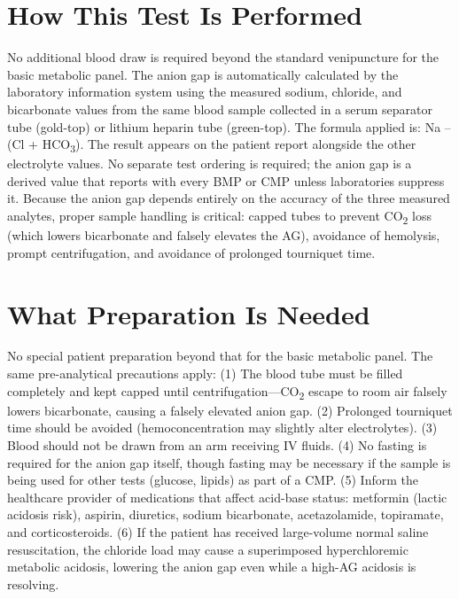 \section*{How This Test Is Performed}
No additional blood draw is required beyond the standard venipuncture for the basic metabolic panel. The anion gap is automatically calculated by the laboratory information system using the measured sodium, chloride, and bicarbonate values from the same blood sample collected in a serum separator tube (gold-top) or lithium heparin tube (green-top). The formula applied is: Na -- (Cl + HCO\textsubscript{3}). The result appears on the patient report alongside the other electrolyte values. No separate test ordering is required; the anion gap is a derived value that reports with every BMP or CMP unless laboratories suppress it. Because the anion gap depends entirely on the accuracy of the three measured analytes, proper sample handling is critical: capped tubes to prevent CO\textsubscript{2} loss (which lowers bicarbonate and falsely elevates the AG), avoidance of hemolysis, prompt centrifugation, and avoidance of prolonged tourniquet time.

\section*{What Preparation Is Needed}
No special patient preparation beyond that for the basic metabolic panel. The same pre-analytical precautions apply: (1) The blood tube must be filled completely and kept capped until centrifugation---CO\textsubscript{2} escape to room air falsely lowers bicarbonate, causing a falsely elevated anion gap. (2) Prolonged tourniquet time should be avoided (hemoconcentration may slightly alter electrolytes). (3) Blood should not be drawn from an arm receiving IV fluids. (4) No fasting is required for the anion gap itself, though fasting may be necessary if the sample is being used for other tests (glucose, lipids) as part of a CMP. (5) Inform the healthcare provider of medications that affect acid-base status: metformin (lactic acidosis risk), aspirin, diuretics, sodium bicarbonate, acetazolamide, topiramate, and corticosteroids. (6) If the patient has received large-volume normal saline resuscitation, the chloride load may cause a superimposed hyperchloremic metabolic acidosis, lowering the anion gap even while a high-AG acidosis is resolving.

